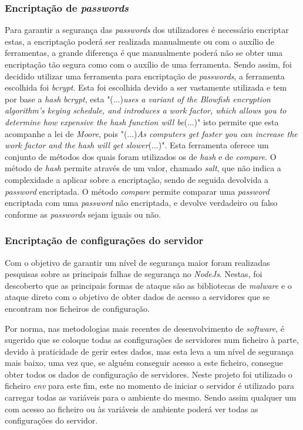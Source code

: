 \subsubsection{Encriptação de \textit{passwords}}
Para garantir a segurança das \textit{passwords} dos utilizadores é necessário encriptar estas, a encriptação poderá ser realizada manualmente ou com o auxílio de ferramentas, a grande diferença é que manualmente poderá não se obter uma encriptação tão segura como com o auxílio de uma ferramenta. Sendo assim, foi decidido utilizar uma ferramenta para encriptação de \textit{passwords}, a ferramenta escolhida foi \textit{bcrypt}. Esta foi escolhida devido a ser vastamente utilizada e tem por base a \emph{hash} \textit{bcrypt}, esta "(...)\emph{uses a variant of the Blowfish encryption algorithm’s keying schedule, and introduces a work factor, which allows you to determine how expensive the hash function will be}(...)"\citep{bcrypt} isto permite que esta acompanhe a lei de \emph{Moore}, pois "(...)\emph{As computers get faster you can increase the work factor and the hash will get slower}(...)"\citep{bcrypt}. Esta ferramenta oferece um conjunto de métodos dos quais foram utilizados os de \emph{hash} e de \emph{compare}. O método de \emph{hash} permite através de um valor, chamado \textit{salt}, que não indica a complexidade a aplicar sobre a encriptação, sendo de seguida devolvida a \textit{password} encriptada. O método \emph{compare} permite comparar uma \textit{password} encriptada com uma \textit{password} não encriptada, e devolve verdadeiro ou falso conforme as \textit{passwords} sejam iguais ou não.

\newpage
\subsubsection{Encriptação de configurações do servidor}
Com o objetivo de garantir um nível de segurança maior foram realizadas pesquisas sobre as principais falhas de segurança no \textit{NodeJs}. Nestas, foi descoberto que as principais formas de ataque são as bibliotecas de \textit{malware} e o ataque direto com o objetivo de obter dados de acesso a servidores que se encontram nos ficheiros de configuração.

Por norma, nas metodologias mais recentes de desenvolvimento de \emph{software}, é sugerido que se coloque todas as configurações de servidores num ficheiro à parte, devido à praticidade de gerir estes dados, mas esta leva a um nível de segurança mais baixo, uma vez que, se alguém conseguir acesso a este ficheiro, consegue obter todos os dados de configuração de servidores. Neste projeto foi utilizado o ficheiro \textit{env} para este fim, este no momento de iniciar o servidor é utilizado para carregar todas as variáveis para o ambiente do mesmo. Sendo assim qualquer um com acesso ao ficheiro ou às variáveis de ambiente poderá ver todas as configurações do servidor.


